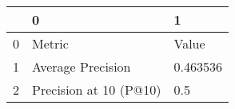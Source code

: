 \begin{tabular}{lll}
\toprule
{} &                       0 &         1 \\
\midrule
0 &                  Metric &     Value \\
1 &       Average Precision &  0.463536 \\
2 &  Precision at 10 (P@10) &       0.5 \\
\bottomrule
\end{tabular}
